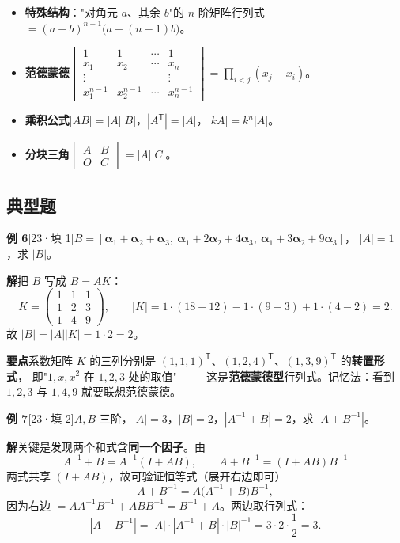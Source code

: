 \documentclass[10pt]{ctexart}
\newcommand{\TT}{^{\mathsf T}}
\newcommand{\bv}[1]{\begin{pmatrix}#1\end{pmatrix}}
\newcommand{\yiii}[1]{\textcolor{y23}{[23·#1]}}
\begin{document}
\begin{itemize}
\item \textbf{特殊结构}："对角元 $a$、其余 $b$"的 $n$ 阶矩阵行列式 $=(a-b)^{n-1}\big(a+(n-1)b\big)$。
\item \textbf{范德蒙德}\quad $\begin{vmatrix}1&1&\cdots&1\\x_1&x_2&\cdots&x_n\\\vdots&&&\vdots\\x_1^{n-1}&x_2^{n-1}&\cdots&x_n^{n-1}\end{vmatrix}
=\prod_{i<j}(x_j-x_i)$。
\item \textbf{乘积公式}\quad $|AB|=|A||B|$，$|A\TT|=|A|$，$|kA|=k^n|A|$。
\item \textbf{分块三角}\quad $\begin{vmatrix}A&B\\O&C\end{vmatrix}=|A||C|$。
\end{itemize}

\subsection{典型题}

\textbf{例 6}\yiii{填 1}\quad $B=[\boldsymbol\alpha_1+\boldsymbol\alpha_2+\boldsymbol\alpha_3,\ \boldsymbol\alpha_1+2\boldsymbol\alpha_2+4\boldsymbol\alpha_3,\ \boldsymbol\alpha_1+3\boldsymbol\alpha_2+9\boldsymbol\alpha_3]$，
$|A|=1$，求 $|B|$。

\textbf{解}\quad 把 $B$ 写成 $B=AK$：
\[
K=\bv{1&1&1\\1&2&3\\1&4&9},\qquad |K|=1\cdot(18-12)-1\cdot(9-3)+1\cdot(4-2)=2 .
\]
故 $|B|=|A||K|=1\cdot2=2$。

\begin{tipbox}
\textbf{要点}\quad 系数矩阵 $K$ 的三列分别是 $(1,1,1)\TT$、$(1,2,4)\TT$、$(1,3,9)\TT$ 的\textbf{转置形式}，
即"$1,x,x^2$ 在 $1,2,3$ 处的取值" —— 这是\textbf{范德蒙德型}行列式。记忆法：看到 $1,2,3$ 与 $1,4,9$ 就要联想范德蒙德。
\end{tipbox}

\medskip
\textbf{例 7}\yiii{填 2}\quad $A,B$ 三阶，$|A|=3$，$|B|=2$，$|A^{-1}+B|=2$，求 $|A+B^{-1}|$。

\textbf{解}\quad 关键是发现两个和式含\textbf{同一个因子}。由
\[
A^{-1}+B=A^{-1}(I+AB),\qquad A+B^{-1}=(I+AB)B^{-1}
\]
两式共享 $(I+AB)$，故可验证恒等式（展开右边即可）
\[
A+B^{-1}=A\big(A^{-1}+B\big)B^{-1},
\]
因为右边 $=AA^{-1}B^{-1}+ABB^{-1}=B^{-1}+A$。两边取行列式：
\[
|A+B^{-1}|=|A|\cdot|A^{-1}+B|\cdot|B|^{-1}=3\cdot2\cdot\frac12=3 .
\]
\end{document}
